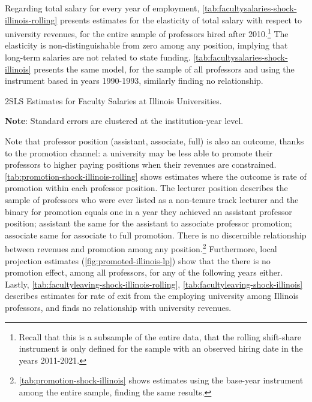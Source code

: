 Regarding total salary for every year of employment, \autoref{tab:facultysalaries-shock-illinois-rolling} presents estimates for the elasticity of total salary with respect to university revenues, for the entire sample of professors hired after 2010.\footnote{
    Recall that this is a subsample of the entire data, that the rolling shift-share instrument is only defined for the sample with an observed hiring date in the years 2011-2021.
}
The elasticity is non-distinguishable from zero among any position, implying that long-term salaries are not related to state funding.
\autoref{tab:facultysalaries-shock-illinois} presents the same model, for the sample of all professors and using the instrument based in years 1990-1993, similarly finding no relationship.

\begin{table}[h!]
    \singlespacing
    \centering
    \caption{2SLS Estimates for Faculty Salaries at Illinois Universities.}
    \makebox[\textwidth][c]{}
    \begin{flushleft}
        \footnotesize
        \textbf{Note}: Standard errors are clustered at the institution-year level.
    \end{flushleft}
    \label{tab:facultysalaries-shock-illinois-rolling}
\end{table}

Note that professor position (assistant, associate, full) is also an outcome, thanks to the promotion channel: a university may be less able to promote their professors to higher paying positions when their revenues are constrained.
\autoref{tab:promotion-shock-illinois-rolling} shows estimates where the outcome is rate of promotion within each professor position.
The lecturer position describes the sample of professors who were ever listed as a non-tenure track lecturer and the binary for promotion equals one in a year they achieved an assistant professor position; assistant the same for the assistant to associate professor promotion; associate same for associate to full promotion.
There is no discernible relationship between revenues and promotion among any position.\footnote{
    \autoref{tab:promotion-shock-illinois} shows estimates using the base-year instrument among the entire sample, finding the same results.
}
Furthermore, local projection estimates (\autoref{fig:promoted-illinois-lp}) show that the there is no promotion effect, among all professors, for any of the following years either.
Lastly, \autoref{tab:facultyleaving-shock-illinois-rolling}, \ref{tab:facultyleaving-shock-illinois} describes estimates for rate of exit from the employing university among Illinois professors, and finds no relationship with university revenues.
